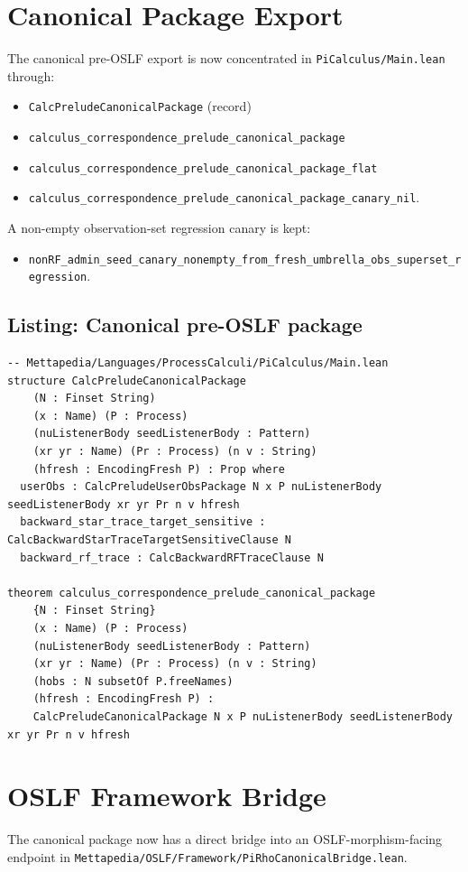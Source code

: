 \documentclass[11pt]{article}
\begin{document}
\section{Canonical Package Export}
The canonical pre-OSLF export is now concentrated in
\texttt{PiCalculus/Main.lean} through:
\begin{itemize}
  \item \texttt{CalcPreludeCanonicalPackage} (record)
  \item \texttt{calculus\_correspondence\_prelude\_canonical\_package}
  \item \texttt{calculus\_correspondence\_prelude\_canonical\_package\_flat}
  \item \texttt{calculus\_correspondence\_prelude\_canonical\_package\_canary\_nil}.
\end{itemize}

A non-empty observation-set regression canary is kept:
\begin{itemize}
  \item \texttt{nonRF\_admin\_seed\_canary\_nonempty\_from\_fresh\_umbrella\_obs\_superset\_regression}.
\end{itemize}

\subsection*{Listing: Canonical pre-OSLF package}
\begin{lstlisting}
-- Mettapedia/Languages/ProcessCalculi/PiCalculus/Main.lean
structure CalcPreludeCanonicalPackage
    (N : Finset String)
    (x : Name) (P : Process)
    (nuListenerBody seedListenerBody : Pattern)
    (xr yr : Name) (Pr : Process) (n v : String)
    (hfresh : EncodingFresh P) : Prop where
  userObs : CalcPreludeUserObsPackage N x P nuListenerBody seedListenerBody xr yr Pr n v hfresh
  backward_star_trace_target_sensitive : CalcBackwardStarTraceTargetSensitiveClause N
  backward_rf_trace : CalcBackwardRFTraceClause N

theorem calculus_correspondence_prelude_canonical_package
    {N : Finset String}
    (x : Name) (P : Process)
    (nuListenerBody seedListenerBody : Pattern)
    (xr yr : Name) (Pr : Process) (n v : String)
    (hobs : N subsetOf P.freeNames)
    (hfresh : EncodingFresh P) :
    CalcPreludeCanonicalPackage N x P nuListenerBody seedListenerBody xr yr Pr n v hfresh
\end{lstlisting}

\section{OSLF Framework Bridge}
The canonical package now has a direct bridge into an OSLF-morphism-facing
endpoint in
\texttt{Mettapedia/OSLF/Framework/PiRhoCanonicalBridge.lean}.
\end{document}
